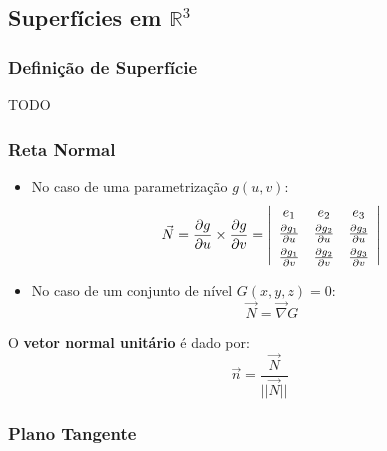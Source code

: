 \documentclass[11pt, a4paper]{article}
\begin{document}
\subsection{Superfícies em $\mathbb{R}^3$}

\subsubsection{Definição de Superfície}

TODO

\subsubsection{Reta Normal}

\begin{itemize}
    \item No caso de uma parametrização $g(u,v)$:
          \begin{equation*}
              \vec{N} = \frac{\partial g}{\partial u} \times \frac{\partial g}{\partial v}
              = \left\vert
              \begin{array}{c c c}
                  e_1                             & e_2 & e_3 \\[2pt]
                  \frac{\partial g_1}{\partial u} &
                  \frac{\partial g_2}{\partial u} &
                  \frac{\partial g_3}{\partial u}             \\[4pt]
                  \frac{\partial g_1}{\partial v} &
                  \frac{\partial g_2}{\partial v} &
                  \frac{\partial g_3}{\partial v}
              \end{array}
              \right\vert
          \end{equation*}
    \item No caso de um conjunto de nível $G(x, y, z) = 0$:
          \begin{equation*}
              \vec{N} = \vec{\nabla} G
          \end{equation*}
\end{itemize}

O \textbf{vetor normal unitário} é dado por:
\begin{equation*}
    \vec{n} = \frac{\vec{N}}{||\vec{N}||}
\end{equation*}

\subsubsection{Plano Tangente}
\end{document}
